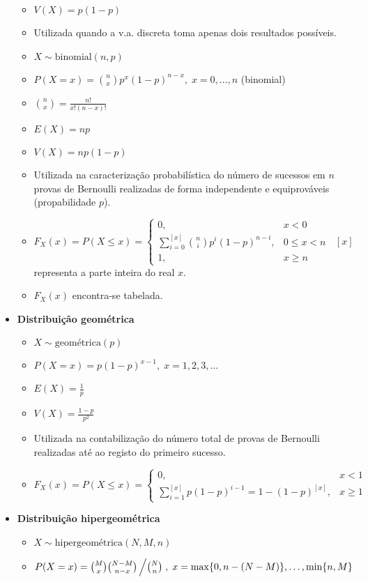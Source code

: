 \documentclass[a4paper]{report}
\newcommand{\bld}{\textbf}
\begin{document}
\begin{itemize}
\begin{itemize}
			\item $V(X)=p(1-p)$
			\item Utilizada quando a v.a. discreta toma apenas dois resultados possíveis.
			\item $X\sim \text{binomial}(n,p)$
			\item $P(X=x)=\binom n x p^x(1-p)^{n-x},\;x=0,\ldots,n$ (binomial)
			\item $\binom n x=\frac{n!}{x!(n-x)!}$
			\item $E(X)=np$
			\item $V(X)=np(1-p)$
			\item Utilizada na caracterização probabilística do número de sucessos em $n$ provas de Bernoulli realizadas de forma independente e equiprováveis (propabilidade $p$).
			\item $F_X(x)=P(X\leq x)=\begin{cases}
			0,&x<0\\
			\sum_{i=0}^{[x]}\binom n i p^i(1-p)^{n-i},&0\leq x<n\\
			1,&x\geq n
			\end{cases}\;\;[x]$ representa a parte inteira do real $x$.
			\item $F_X(x)$ encontra-se tabelada.
		\end{itemize}
		\item {\large \bld{Distribuição geométrica}}
		\begin{itemize}
			\item $X\sim \text{geométrica}(p)$
			\item $P(X=x)=p(1-p)^{x-1},\;x=1,2,3,\ldots$
			\item $E(X)=\frac 1 p$
			\item $V(X)=\frac{1-p}{p^2}$
			\item Utilizada na contabilização do número total de provas de Bernoulli realizadas até ao registo do primeiro sucesso.
			\item $F_X(x)=P(X\leq x)=\begin{cases}
			0,&x<1\\
			\sum_{i=1}^{[x]}p(1-p)^{i-1}=1-(1-p)^{[x]},&x\geq 1
			\end{cases}$
		\end{itemize}
		\item {\large \bld{Distribuição hipergeométrica}}
		\begin{itemize}
			\item $X\sim\text{hipergeométrica}(N,M,n)$
			\item $P(X=x)=\binom M x \binom{N-M}{n-x}\left/\binom N n \right.,\;x=\max\{0,n-(N-M)\},\ldots,\min\{n,M\}$

\end{itemize}
\end{itemize}
\end{document}
